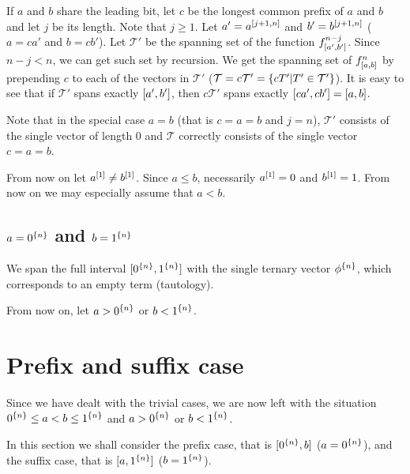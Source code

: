 If $a$ and $b$ share the leading bit,
let $c$ be the longest common prefix of $a$ and $b$
and let $j$ be its length.
Note that $j \geq 1$.
Let $a' = a^{[j+1, n]}$ and $b' = b^{[j+1, n]}$
($a = ca'$ and $b = cb'$).
Let $\mathcal{T}'$ be the spanning set of
the function $f^{n-j}_{[a', b']}$.
Since $n-j < n$,
we can get such set by recursion.
We get the spanning set of $f^{n}_{[a, b]}$
by prepending $c$
to each of the vectors in $\mathcal{T}'$
($\mathcal{T} = c \mathcal{T}'
= \{cT' | T' \in \mathcal{T}'\}$).
It is easy to see that if $\mathcal{T}'$
spans exactly $[a', b']$,
then $c \mathcal{T}'$ spans exactly
$[c a', c b'] = [a, b]$.

Note that in the special case $a=b$
(that is $c=a=b$ and $j=n$),
$\mathcal{T}'$ consists of the single vector of length $0$
and $\mathcal{T}$ correctly consists of the single vector $c=a=b$.

From now on let $a^{[1]} \neq b^{[1]}$.
Since $a \leq b$,
necessarily $a^{[1]} = 0$ and $b^{[1]} = 1$.
From now on we may especially assume that $a < b$.

\subsection{\texorpdfstring
{$a = 0^{\{n\}}$}{a = }
and
\texorpdfstring{$b = 1^{\{n\}}$}{b = }
}

We span the full interval
$[0^{\{n\}}, 1^{\{n\}}]$
with the single ternary vector $\phi^{\{n\}}$,
which corresponds to an empty term (tautology).

From now on,
let $a > 0^{\{n\}}$ or $b < 1^{\{n\}}$.

\section{Prefix and suffix case}
\label{sec:prefixsuffix}


Since we have dealt with the trivial cases,
we are now left with the situation
$0^{\{n\}} \leq a < b \leq 1^{\{n\}}$
and
$a > 0^{\{n\}}$ or $b < 1^{\{n\}}$.

In this section we shall consider the prefix case,
that is $[0^{\{n\}}, b]$ ($a = 0^{\{n\}}$),
and the suffix case,
that is $[a, 1^{\{n\}}]$ ($b = 1^{\{n\}}$).

